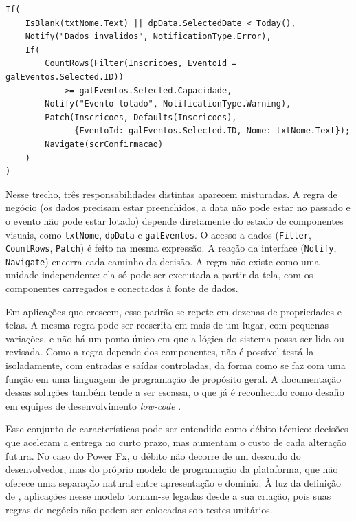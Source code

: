 \begin{lstlisting}[basicstyle=\ttfamily\small,frame=single,breaklines=true]
If(
    IsBlank(txtNome.Text) || dpData.SelectedDate < Today(),
    Notify("Dados invalidos", NotificationType.Error),
    If(
        CountRows(Filter(Inscricoes, EventoId = galEventos.Selected.ID))
            >= galEventos.Selected.Capacidade,
        Notify("Evento lotado", NotificationType.Warning),
        Patch(Inscricoes, Defaults(Inscricoes),
              {EventoId: galEventos.Selected.ID, Nome: txtNome.Text});
        Navigate(scrConfirmacao)
    )
)
\end{lstlisting}

Nesse trecho, três responsabilidades distintas aparecem misturadas. A regra de negócio (os dados precisam estar preenchidos, a data não pode estar no passado e o evento não pode estar lotado) depende diretamente do estado de componentes visuais, como \texttt{txtNome}, \texttt{dpData} e \texttt{galEventos}. O acesso a dados (\texttt{Filter}, \texttt{CountRows}, \texttt{Patch}) é feito na mesma expressão. A reação da interface (\texttt{Notify}, \texttt{Navigate}) encerra cada caminho da decisão. A regra não existe como uma unidade independente: ela só pode ser executada a partir da tela, com os componentes carregados e conectados à fonte de dados.

Em aplicações que crescem, esse padrão se repete em dezenas de propriedades e telas. A mesma regra pode ser reescrita em mais de um lugar, com pequenas variações, e não há um ponto único em que a lógica do sistema possa ser lida ou revisada. Como a regra depende dos componentes, não é possível testá-la isoladamente, com entradas e saídas controladas, da forma como se faz com uma função em uma linguagem de programação de propósito geral. A documentação dessas soluções também tende a ser escassa, o que já é reconhecido como desafio em equipes de desenvolvimento \textit{low-code} \cite{carlos2025lowcode}.

Esse conjunto de características pode ser entendido como débito técnico: decisões que aceleram a entrega no curto prazo, mas aumentam o custo de cada alteração futura. No caso do Power Fx, o débito não decorre de um descuido do desenvolvedor, mas do próprio modelo de programação da plataforma, que não oferece uma separação natural entre apresentação e domínio. À luz da definição de , aplicações nesse modelo tornam-se legadas desde a sua criação, pois suas regras de negócio não podem ser colocadas sob testes unitários.

